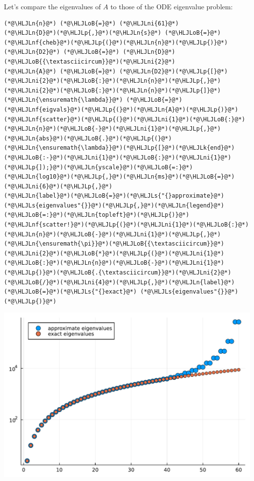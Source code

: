 \documentclass[12pt,a4paper]{article}
\newcommand{\HLJLk}[1]{\textcolor[RGB]{148,91,176}{\textbf{#1}}}
\newcommand{\HLJLn}[1]{#1}
\newcommand{\HLJLnf}[1]{\textcolor[RGB]{66,102,213}{#1}}
\newcommand{\HLJLs}[1]{\textcolor[RGB]{201,61,57}{#1}}
\newcommand{\HLJLni}[1]{\textcolor[RGB]{59,151,46}{#1}}
\newcommand{\HLJLoB}[1]{\textcolor[RGB]{102,102,102}{\textbf{#1}}}
\newcommand{\HLJLp}[1]{#1}
\begin{document}
Let's compare the eigenvalues of $A$ to those of the ODE eigenvalue problem:


\begin{lstlisting}
(*@\HLJLn{n}@*) (*@\HLJLoB{=}@*) (*@\HLJLni{61}@*)
(*@\HLJLn{D}@*)(*@\HLJLp{,}@*)(*@\HLJLn{s}@*) (*@\HLJLoB{=}@*) (*@\HLJLnf{cheb}@*)(*@\HLJLp{(}@*)(*@\HLJLn{n}@*)(*@\HLJLp{)}@*)
(*@\HLJLn{D2}@*) (*@\HLJLoB{=}@*) (*@\HLJLn{D}@*)(*@\HLJLoB{{\textasciicircum}}@*)(*@\HLJLni{2}@*)
(*@\HLJLn{A}@*) (*@\HLJLoB{=}@*) (*@\HLJLn{D2}@*)(*@\HLJLp{[}@*)(*@\HLJLni{2}@*)(*@\HLJLoB{:}@*)(*@\HLJLn{n}@*)(*@\HLJLp{,}@*)(*@\HLJLni{2}@*)(*@\HLJLoB{:}@*)(*@\HLJLn{n}@*)(*@\HLJLp{]}@*)
(*@\HLJLn{\ensuremath{\lambda}}@*) (*@\HLJLoB{=}@*) (*@\HLJLnf{eigvals}@*)(*@\HLJLp{(}@*)(*@\HLJLn{A}@*)(*@\HLJLp{)}@*)
(*@\HLJLnf{scatter}@*)(*@\HLJLp{(}@*)(*@\HLJLni{1}@*)(*@\HLJLoB{:}@*)(*@\HLJLn{n}@*)(*@\HLJLoB{-}@*)(*@\HLJLni{1}@*)(*@\HLJLp{,}@*)(*@\HLJLn{abs}@*)(*@\HLJLoB{.}@*)(*@\HLJLp{(}@*)(*@\HLJLn{\ensuremath{\lambda}}@*)(*@\HLJLp{[}@*)(*@\HLJLk{end}@*)(*@\HLJLoB{:-}@*)(*@\HLJLni{1}@*)(*@\HLJLoB{:}@*)(*@\HLJLni{1}@*)(*@\HLJLp{]);}@*)(*@\HLJLn{yscale}@*)(*@\HLJLoB{=:}@*)(*@\HLJLn{log10}@*)(*@\HLJLp{,}@*)(*@\HLJLn{ms}@*)(*@\HLJLoB{=}@*)(*@\HLJLni{6}@*)(*@\HLJLp{,}@*)
(*@\HLJLn{label}@*)(*@\HLJLoB{=}@*)(*@\HLJLs{"{}approximate}@*) (*@\HLJLs{eigenvalues"{}}@*)(*@\HLJLp{,}@*)(*@\HLJLn{legend}@*)(*@\HLJLoB{=:}@*)(*@\HLJLn{topleft}@*)(*@\HLJLp{)}@*)
(*@\HLJLnf{scatter!}@*)(*@\HLJLp{(}@*)(*@\HLJLni{1}@*)(*@\HLJLoB{:}@*)(*@\HLJLn{n}@*)(*@\HLJLoB{-}@*)(*@\HLJLni{1}@*)(*@\HLJLp{,}@*)(*@\HLJLn{\ensuremath{\pi}}@*)(*@\HLJLoB{{\textasciicircum}}@*)(*@\HLJLni{2}@*)(*@\HLJLoB{*}@*)(*@\HLJLp{(}@*)(*@\HLJLni{1}@*)(*@\HLJLoB{:}@*)(*@\HLJLn{n}@*)(*@\HLJLoB{-}@*)(*@\HLJLni{1}@*)(*@\HLJLp{)}@*)(*@\HLJLoB{.{\textasciicircum}}@*)(*@\HLJLni{2}@*)(*@\HLJLoB{/}@*)(*@\HLJLni{4}@*)(*@\HLJLp{,}@*)(*@\HLJLn{label}@*)(*@\HLJLoB{=}@*)(*@\HLJLs{"{}exact}@*) (*@\HLJLs{eigenvalues"{}}@*)(*@\HLJLp{)}@*)
\end{lstlisting}

\includegraphics[width=\linewidth]{jl_Vz6qXN/Chapter5_43_1.pdf}
\end{document}
